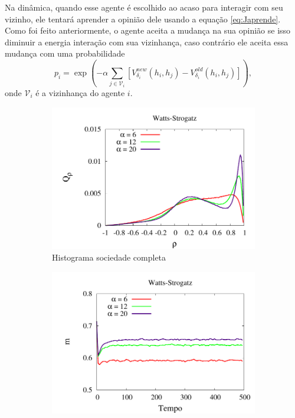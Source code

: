 Na dinâmica, quando esse agente é escolhido ao acaso para interagir
com seu vizinho, ele tentará aprender a opinião dele usando a equação
\ref{eq:Japrende}. Como foi feito anteriormente, o agente aceita a mudança
na sua opinião se isso diminuir a energia interação com sua vizinhança,
caso contrário ele aceita essa mudança com uma probabilidade
\begin{equation}
p_i = \exp\left(-\alpha\sum_{j
    \in\mathcal{V}_i} \left[V_{\delta_i}^{new}\left(h_i,h_j\right)
    -  V_{\delta_i}^{old}\left(h_i,h_j\right) \right]\right), 
\end{equation}
onde $\mathcal{V}_i$ é a vizinhança do agente $i$. 

\begin{figure}
\centering
    \begin{subfigure}[]{\textwidth}
        \centering
        \includegraphics[width=\textwidth]{Figures/ComparaHistoD01Beta}
        \caption{Histograma sociedade completa}
    \end{subfigure}
    \begin{subfigure}[]{\textwidth}
        \centering
        \includegraphics[width=\textwidth]{Figures/MagCompleto1Beta}

\end{subfigure}
\end{figure}
